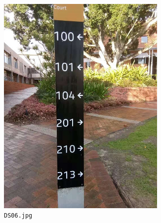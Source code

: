 \documentclass{article}
\begin{document}
\begin{figure}[h]
  \centering
  \begin{subfigure}[t]{0.22\textwidth}
    \centering
    \includegraphics[width=0.9\textwidth]{../train/task2/DS06}
    \caption[DS06]{
      \lstinline{DS06.jpg}
    }
    \label{fig:ds06}
  \end{subfigure}
  \begin{subfigure}[t]{0.22\textwidth}
    \centering

\end{subfigure}
\end{figure}
\end{document}
